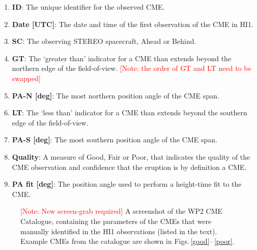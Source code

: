 \documentclass[10pt, a4paper, oneside]{article}
\begin{document}
\begin{enumerate}
\item {\bf ID}: The unique identifier for the observed CME.
\item {\bf Date [UTC]}: The date and time of the first observation of the CME in HI1.
\item {\bf SC}: The observing STEREO spacecraft, Ahead or Behind.
\item {\bf GT}: The `greater than' indicator for a CME than extends beyond the northern edge of the field-of-view. \textcolor{red}{[Note: the order of GT and LT need to be swapped]}
\item {\bf PA-N [deg]}: The most northern position angle of the CME span.
\item {\bf LT}: The `less than' indicator for a CME than extends beyond the southern edge of the field-of-view.
\item {\bf PA-S [deg]}: The most southern position angle of the CME span.
\item {\bf Quality}: A measure of Good, Fair or Poor, that indicates the quality of the CME observation and confidence that the eruption is by definition a CME.
\item {\bf PA fit [deg]}: The position angle used to perform a height-time fit to the CME.
\end{enumerate}


\begin{figure}[ht]
\caption{\textcolor{red}{[Note: New screen-grab required]} A screenshot of the WP2 CME Catalogue, containing the parameters of the CMEs that were manually identified in the HI1 observations (listed in the text). Example CMEs from the catalogue are shown in Figs.\,\ref{good}--\,\ref{poor}.}
\label{catalogue}
\end{figure}
\end{document}
